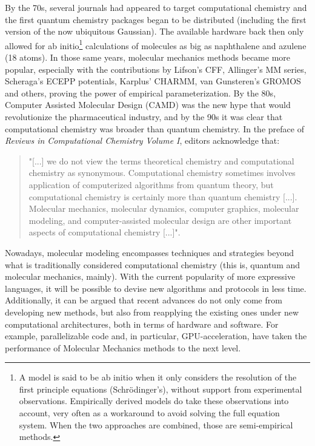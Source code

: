 By the 70s, several journals had appeared to target computational chemistry and the first quantum chemistry packages began to be distributed (including the first version of the now ubiquitous Gaussian\cite{gaussian}). The available hardware back then only allowed for ab initio\footnote{ A model is said to be ab initio when it only considers the resolution of the first principle equations (Schrödinger's), without support from experimental observations. Empirically derived models do take these observations into account, very often as a workaround to avoid solving the full equation system. When the two approaches are combined, those are semi-empirical methods.  } calculations of molecules as big as naphthalene and azulene (18 atoms). In those same years, molecular mechanics methods became more popular, especially with the contributions by Lifson's CFF,\cite{lifson1968consistent,hagler1974energy,niketic1977lecture} Allinger's MM series,\cite{allinger1973,allinger1977} Scheraga's ECEPP potentials,\cite{momany1975energy,nemethy1983energy} Karplus’ CHARMM,\cite{brooks1983} van Gunsteren's GROMOS\cite{van1987groningen} and others, proving the power of empirical parameterization. By the 80s, Computer Assisted Molecular Design (CAMD) was the new hype that would revolutionize the pharmaceutical industry,\cite{fortune1981} and by the 90s it was clear that computational chemistry was broader than quantum chemistry. In the preface of \textit{Reviews in Computational Chemistry Volume I},\cite{lipkovitz1990} editors acknowledge that:

\begin{quote}
	"[...] we do not view the terms theoretical chemistry and computational chemistry as synonymous. Computational chemistry sometimes involves application of computerized algorithms from quantum theory, but computational chemistry is certainly more than quantum chemistry [...]. Molecular mechanics, molecular dynamics, computer graphics, molecular modeling, and computer-assisted molecular design are other important aspects of computational chemistry [...]".
\end{quote}

Nowadays, molecular modeling encompasses techniques and strategies beyond what is traditionally considered computational chemistry (this is, quantum and molecular mechanics, mainly). With the current popularity of more expressive languages, it will be possible to devise new algorithms and protocols in less time. Additionally, it can be argued that recent advances do not only come from developing new methods, but also from reapplying the existing ones under new computational architectures, both in terms of hardware and software. For example, parallelizable code and, in particular, GPU-acceleration, have taken the performance of Molecular Mechanics methods to the next level.

